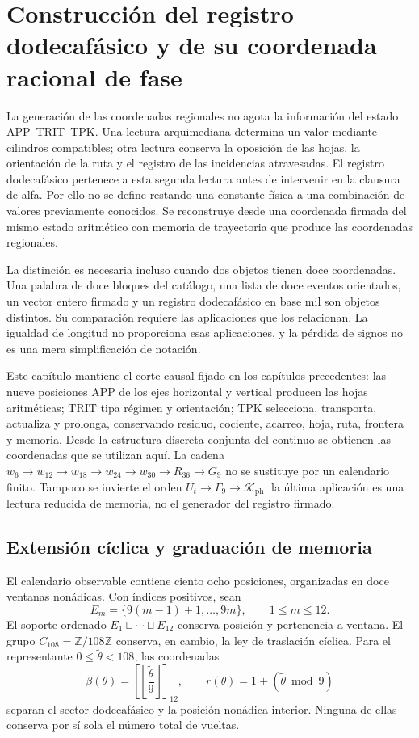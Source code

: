 \section{Construcción del registro dodecafásico y de su coordenada racional de fase}
\label{sec:k-registro}

La generación de las coordenadas regionales no agota la información del
estado APP--TRIT--TPK. Una lectura arquimediana determina un valor mediante
cilindros compatibles; otra lectura conserva la oposición de las hojas, la
orientación de la ruta y el registro de las incidencias atravesadas. El
registro dodecafásico pertenece a esta segunda lectura antes de intervenir en
la clausura de alfa. Por ello no se define restando una constante física a
una combinación de valores previamente conocidos. Se reconstruye desde una
coordenada firmada del mismo estado aritmético con memoria de trayectoria que produce las coordenadas
regionales.

La distinción es necesaria incluso cuando dos objetos tienen doce
coordenadas. Una palabra de doce bloques del catálogo, una lista de doce
eventos orientados, un vector entero firmado y un registro dodecafásico en base mil son
objetos distintos. Su comparación requiere las aplicaciones que los
relacionan. La igualdad de longitud no proporciona esas aplicaciones, y la
pérdida de signos no es una mera simplificación de notación.

Este capítulo mantiene el corte causal fijado en los capítulos precedentes:
las nueve posiciones APP de los ejes horizontal y vertical producen las
hojas aritméticas; TRIT tipa régimen y orientación; TPK selecciona,
transporta, actualiza y prolonga, conservando residuo, cociente, acarreo,
hoja, ruta, frontera y memoria. Desde la estructura discreta conjunta del
continuo se obtienen las coordenadas que se utilizan aquí. La cadena
\(w_6\to w_{12}\to w_{18}\to w_{24}\to w_{30}\to R_{36}\to G_9\)
no se sustituye por un calendario finito. Tampoco se invierte el orden
\(U_t\to\Gamma_9\to\mathcal K_{\mathrm{ph}}\): la última aplicación es una
lectura reducida de memoria, no el generador del registro firmado.



\subsection{Extensión cíclica y graduación de memoria}
\label{subsec:k-calendario}

El calendario observable contiene ciento ocho posiciones, organizadas en
doce ventanas nonádicas. Con índices positivos, sean
\[
 E_m=\{9(m-1)+1,\ldots,9m\},\qquad 1\leq m\leq12.
\]
El soporte ordenado \(E_1\sqcup\cdots\sqcup E_{12}\) conserva posición y
pertenencia a ventana. El grupo \(C_{108}=\mathbb Z/108\mathbb Z\)
conserva, en cambio, la ley de traslación cíclica. Para el representante
\(0\leq\widetilde\theta<108\), las coordenadas
\[
 \beta(\theta)=\left[\left\lfloor\frac{\widetilde\theta}{9}\right\rfloor\right]_{12},
 \qquad r(\theta)=1+(\widetilde\theta\bmod9)
\]
separan el sector dodecafásico y la posición nonádica interior. Ninguna de
ellas conserva por sí sola el número total de vueltas.

